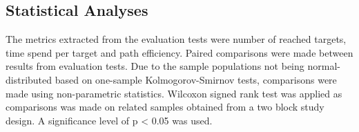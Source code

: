 \subsection{Statistical Analyses}
The metrics extracted from the evaluation tests were number of reached targets, time spend per target and path efficiency. Paired comparisons were made between results from evaluation tests. Due to the sample populations not being normal-distributed based on one-sample Kolmogorov-Smirnov tests, comparisons were made using non-parametric statistics. Wilcoxon signed rank test was applied as comparisons was made on related samples obtained from a two block study design. A significance level of p < 0.05 was used.